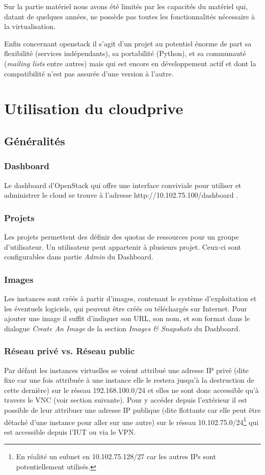 \documentclass[a4paper,oneside]{report}
\begin{document}
Sur la partie matériel nous avons été limités par les capacités du matériel qui, datant de quelques années, ne possède pas toutes les fonctionnalités nécessaire à la virtualisation.

Enfin concernant \gls{openstack} il s'agit d'un projet au potentiel énorme de part sa flexibilité (services indépendants), sa portabilité (Python), et sa communauté (\emph{mailing lists} entre autres) mais qui est encore en développement actif et dont la compatibilité n'est pas assurée d'une version à l'autre.




\appendix
\chapter{Utilisation du \gls{cloudprive}}
\section{Généralités}
\subsection{Dashboard}
Le dashboard d'OpenStack qui offre une interface conviviale pour utiliser et administrer le cloud se trouve à l'adresse http://10.102.75.100/dashboard .
\subsection{Projets}
Les projets permettent des définir des quotas de ressources pour un groupe d'utilisateur. Un utilisateur peut appartenir à plusieurs projet. Ceux-ci sont configurables dans partie \emph{Admin} du Dashboard.

\subsection{Images}
Les instances sont créés à partir d'images, contenant le système d'exploitation et les éventuels logiciels, qui peuvent être créés ou téléchargés sur Internet. Pour ajouter une image il suffit d'indiquer son URL, son nom, et son format dans le dialogue \emph{Create An Image} de la section \emph{Images \& Snapshots} du Dashboard.

\subsection{Réseau privé vs. Réseau public}
Par défaut les instances virtuelles se voient attribué une adresse IP privé (dite fixe car une fois attribuée à une instance elle le restera jusqu'à la destruction de cette dernière) sur le réseau 192.168.100.0/24 et elles ne sont donc accessible qu'à travers le VNC (voir section suivante).
Pour y accéder depuis l'extérieur il est possible de leur attribuer une adresse IP publique (dite flottante car elle peut être détaché d'une instance pour aller sur une autre) sur le réseau 10.102.75.0/24\footnote{En réalité un subnet en 10.102.75.128/27 car les autres IPs sont potentiellement utilisés.} qui est accessible depuis l'IUT ou via le VPN.
\end{document}
